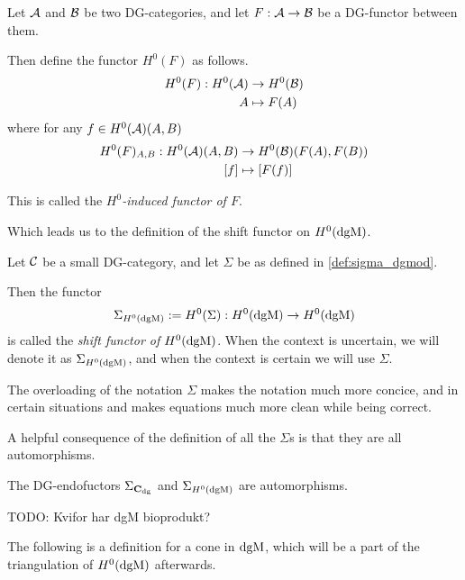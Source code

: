 \begin{definition}
    \label{def:H^0-induced_functor}
    Let \( {\mathcal{A}} \) and \( {\mathcal{B}} \) be two DG-categories, and let \( F: {\mathcal{A}} \to {\mathcal{B}} \) be a DG-functor between them.

    Then define the functor \( H^0(F) \) as follows.
    \begin{align*}
        H^0(F): H^0({\mathcal{A}}) &\to H^0({\mathcal{B}}) \\
        A &\mapsto F(A)
    \end{align*}
    where for any \( f \in H^0({\mathcal{A}})(A, B) \)
    \begin{align*}
        H^0(F)_{A, B}: H^0({\mathcal{A}})(A, B) &\to H^0({\mathcal{B}})(F(A), F(B)) \\
        [f] &\mapsto [F(f)]
    \end{align*}

    This is called the \emph{\( H^0 \)-induced functor of \( F \)}.
\end{definition}

Which leads us to the definition of the shift functor on \( H^0(\operatorname{dgM}) \).

\begin{definition}
    \label{def:sigma_h_0_dgmod}
    Let \( {\mathcal{C}} \) be a small DG-category, and let \( \Sigma \) be as defined in \autoref{def:sigma_dgmod}.

    Then the functor
    \[
        \Sigma_{H^0(\operatorname{dgM})} := H^0(\Sigma): H^0(\operatorname{dgM}) \to H^0(\operatorname{dgM})
    \]
    is called the \emph{shift functor of \( H^0(\operatorname{dgM}) \)}. When the context is uncertain, we will denote it as \( \Sigma_{H^0(\operatorname{dgM})} \), and when the context is certain we will use \( \Sigma \).
\end{definition}

The overloading of the notation \( \Sigma \) makes the notation much more concice, and in certain situations and makes equations much more clean while being correct.

A helpful consequence of the definition of all the \( \Sigma \)s is that they are all automorphisms.
\begin{remark}
    \label{rem:dgm_sigma_automorphism}
    The DG-endofuctors \( \Sigma_{\operatorname{\mathbf{C}}_{\operatorname{dg}}} \) and \( \Sigma_{H^0(\operatorname{dgM})} \) are automorphisms.
\end{remark}

TODO: Kvifor har dgM bioprodukt?

The following is a definition for a cone in \( \operatorname{dgM} \), which will be a part of the triangulation of \( H^0(\operatorname{dgM}) \) afterwards.

